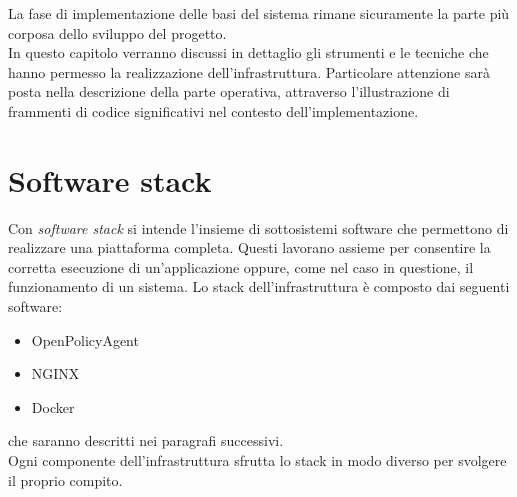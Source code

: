 La fase di implementazione delle basi del sistema rimane sicuramente la parte più corposa dello sviluppo del progetto.
\\ In questo capitolo verranno discussi in dettaglio gli strumenti e le tecniche
che hanno permesso la realizzazione dell'infrastruttura. Particolare attenzione sarà posta nella descrizione 
della parte operativa, attraverso l'illustrazione di frammenti di codice significativi nel contesto dell'implementazione. 

\section{Software stack}
Con \textit{software stack} si intende l'insieme di sottosistemi software che permettono di realizzare una piattaforma completa.
Questi lavorano assieme per consentire la corretta esecuzione di un'applicazione oppure, come nel caso in questione, il 
funzionamento di un sistema.
Lo stack dell'infrastruttura è composto dai seguenti software:
\begin{itemize}
    \item OpenPolicyAgent
    \item NGINX
    \item Docker
\end{itemize}
che saranno descritti nei paragrafi successivi.
\\ Ogni componente dell'infrastruttura sfrutta lo stack in modo diverso per svolgere il proprio compito. 


